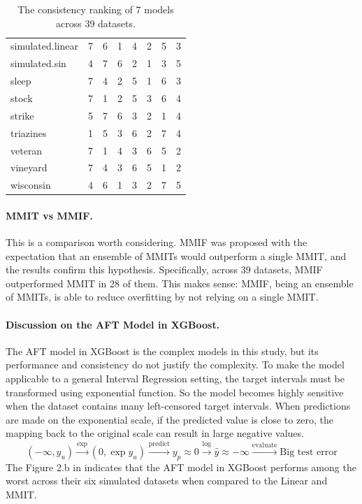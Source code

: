 \documentclass[12pt]{article}
\begin{document}
\begin{table}[!ht]
\begin{tabular}{lrrrrrrr}
simulated.linear & 7 & 6 & 1 & 4 & 2 & 5 & 3 \\
simulated.sin & 4 & 7 & 6 & 2 & 1 & 3 & 5 \\
sleep & 7 & 4 & 2 & 5 & 1 & 6 & 3 \\
stock & 7 & 1 & 2 & 5 & 3 & 6 & 4 \\
strike & 5 & 7 & 6 & 3 & 2 & 1 & 4 \\
triazines & 1 & 5 & 3 & 6 & 2 & 7 & 4 \\
veteran & 7 & 1 & 4 & 3 & 6 & 5 & 2 \\
vineyard & 7 & 4 & 3 & 6 & 5 & 1 & 2 \\
wisconsin & 4 & 6 & 1 & 3 & 2 & 7 & 5 \\
\bottomrule
\end{tabular}
\caption{The consistency ranking of 7 models across 39 datasets.}
\end{table}

\paragraph{MMIT vs MMIF.} 
This is a comparison worth considering.
MMIF was proposed with the expectation that an ensemble of MMITs would outperform a single MMIT, and the results confirm this hypothesis. 
Specifically, across 39 datasets, MMIF outperformed MMIT in 28 of them. 
This makes sense: MMIF, being an ensemble of MMITs, is able to reduce overfitting by not relying on a single MMIT.

\paragraph{Discussion on the AFT Model in XGBoost.}
The AFT model in XGBoost is the complex models in this study, but its performance and consistency do not justify the complexity. 
To make the model applicable to a general Interval Regression setting, the target intervals must be transformed using exponential function. 
So the model becomes highly sensitive when the dataset contains many left-censored target intervals. 
When predictions are made on the exponential scale, if the predicted value is close to zero, the mapping back to the original scale can result in large negative values.
\[
(-\infty, y_u) \overset{\text{exp}}{\longrightarrow} (0, \exp y_u) \overset{\text{predict}}{\longrightarrow} y_p \approx 0 \overset{\text{log}}{\longrightarrow} \hat{y} \approx -\infty \overset{\text{evaluate}}{\longrightarrow} \text{Big test error}
\]
The Figure 2.b in \citep{aft_xgboost} indicates that the AFT model in XGBoost performs among the worst across their six simulated datasets when compared to the Linear and MMIT. 
\end{document}

